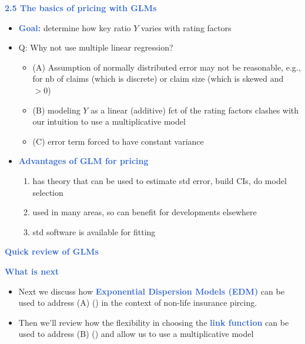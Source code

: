 \documentclass[aspectratio=169,professionalfonts,mathserif,handout]{beamer}
\newcommand{\grey}[1]{{\color{MediumGray}{#1}}}
\newcommand{\highlight}[1]{\textcolor{Highlight}{\bf #1}}
\renewcommand{\(}{\left(}
\renewcommand{\)}{\right)}
\renewcommand{\[}{\left[}
\renewcommand{\]}{\right]}
\newcommand{\mytitle}[1]{\vspace*{-1mm}%
  \centerline{\highlight{\Large #1}}\vspace*{3mm}}
\newenvironment{slidebox}{%
  \begin{minipage}[c][7.5cm][t]{14.4cm}\raggedright}{%
  \end{minipage}}
\begin{document}
\begin{frame}\begin{slidebox}
\mytitle{2.5 The basics of pricing with GLMs}

\begin{itemize}
    \item \highlight{Goal:} determine how key ratio $Y$ varies with rating factors
    \pause
    \item Q: Why not use multiple linear regression?
    \pause
    \begin{itemize}
        \item (A) Assumption of normally distributed error may not be reasonable, e.g., for nb of claims (which is discrete) or claim size (which is skewed and $>0$)
        \pause
        \item (B) modeling $Y$ as a linear (additive) fct of the rating factors clashes with our intuition to use a multiplicative model
        \pause
        \item (C) error term forced to have constant variance
    \end{itemize}
    \pause
    \item \highlight{Advantages of GLM for pricing}
    \pause
    \begin{enumerate}
        \item has theory that can be used to estimate std error, build CIs, do model selection
        \pause
        \item used in many areas, so can benefit for developments elsewhere
        \pause
        \item std software is available for fitting 
    \end{enumerate}
\end{itemize}
\end{slidebox}\end{frame}

\begin{frame}\begin{slidebox}
\mytitle{Quick review of GLMs}
\end{slidebox}\end{frame}

\begin{frame}\begin{slidebox}
\mytitle{What is next}

\begin{itemize}
\item Next we discuss how \highlight{Exponential Dispersion Models (EDM)} can be used to address (A) (\grey{Assumption of normally distributed error may not be reasonable})
in the context of non-life insurance pircing.
\pause
\item Then we'll review how the flexibility in choosing the \highlight{link function} can be used to address (B) (\grey{modeling $Y$ as a linear (additive) fct of the rating factors}) and allow us to use a multiplicative model
\end{itemize}
\end{slidebox}\end{frame}
\end{document}
